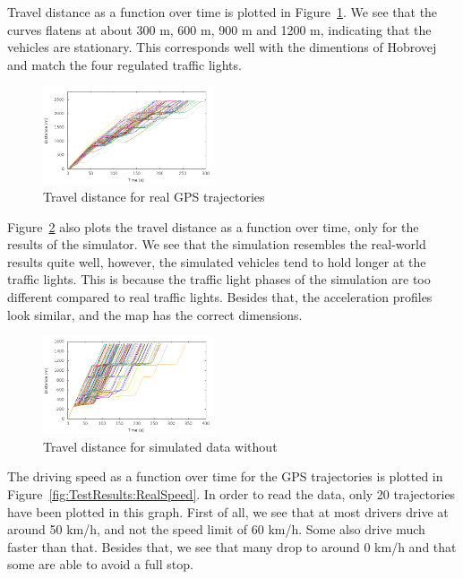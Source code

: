 Travel distance as a function over time is plotted in Figure~\ref{fig:TestResults:realDistance}. 
We see that the curves flatens at about 300 m, 600 m, 900 m and 1200 m, indicating that the vehicles are stationary.
This corresponds well with the dimentions of Hobrovej and match the four regulated traffic lights.
\begin{figure}[htb]
\includegraphics[width=0.45\textwidth]{../images/Real/RealDistance.png}
\caption{Travel distance for real GPS trajectories}
\label{fig:TestResults:realDistance}
\end{figure}

Figure~\ref{fig:TestResults:distance0} also plots the travel distance as a function over time, only for the results of the simulator.
We see that the simulation resembles the real-world results quite well, however, the simulated vehicles tend to hold longer at the traffic lights. 
This is because the traffic light phases of the simulation are too different compared to real traffic lights. 
Besides that, the acceleration profiles look similar, and the map has the correct dimensions.

\begin{figure}[htb]
\includegraphics[width=0.45\textwidth]{../images/tp0c1_0/distanceUncontrolled0.png}
\caption{Travel distance for simulated data without \tech}
\label{fig:TestResults:distance0}
\end{figure}

The driving speed as a function over time for the GPS trajectories is plotted in Figure~\ref{fig:TestResults:RealSpeed}.
In order to read the data, only 20 trajectories have been plotted in this graph.
First of all, we see that at most drivers drive at around 50 km/h, and not the speed limit of 60 km/h. 
Some also drive much faster than that.
Besides that, we see that many drop to around 0 km/h and that some are able to avoid a full stop.

